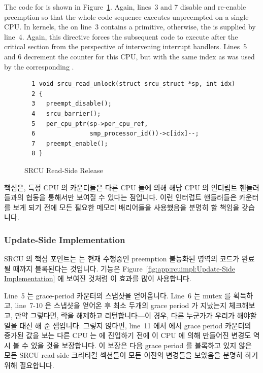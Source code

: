 The code for  is shown in
Figure~\ref{fig:app:rcuimpl:Read-Side Release}.
Again, lines~3 and 7 disable and re-enable preemption so that the
whole code sequence executes unpreempted on a single CPU.
In  kernels, the  on line~3
contains a  primitive, otherwise, the 
is supplied by line~4.
Again, this directive forces the subsequent code to execute after
the critical section from the perspective of intervening
interrupt handlers.
Lines~5 and 6 decrement the counter for this CPU, but with the same
index as was used by the corresponding .
\fi

\begin{figure}[htbp]
{ \scriptsize
\begin{verbatim}
  1 void srcu_read_unlock(struct srcu_struct *sp, int idx)
  2 {
  3   preempt_disable();
  4   srcu_barrier();
  5   per_cpu_ptr(sp->per_cpu_ref,
  6               smp_processor_id())->c[idx]--;
  7   preempt_enable();
  8 }
\end{verbatim}
}
\caption{SRCU Read-Side Release}
\label{fig:app:rcuimpl:Read-Side Release}
\end{figure}

핵심은, 특정 CPU 의 카운터들은 다른 CPU 들에 의해 해당 CPU 의 인터럽트
핸들러들과의 협동을 통해서만 보여질 수 있다는 점입니다.
이런 인터럽트 핸들러들은 카운터를 보게 되기 전에 모든 필요한 메모리 배리어들을
사용했음을 분명히 할 책임을 갖습니다.

\subsubsection{Update-Side Implementation}
\label{sec:app:rcuimpl:Update-Side Implementation}

SRCU 의 핵심 포인트는  는 현재 수행중인 preemption
불능화된 영역의 코드가 완료될 때까지 블록된다는 것입니다.
 기능은
Figure~\ref{fig:app:rcuimpl:Update-Side Implementation} 에 보여진 것처럼 이
효과를 많이 사용합니다.

Line~5 는 grace-period 카운터의 스냅샷을 얻어옵니다.
Line~6 는 mutex 를 획득하고, line~7-10 은 스냅샷을 얻어온 후 최소 두개의 grace
period 가 지났는지 체크해보고, 만약 그렇다면, 락을 해제하고 리턴합니다---이
경우, 다른 누군가가 우리가 해야할 일을 대신 해 준 셈입니다.
그렇지 않다면, line~11 에서  에서 grace period 카운터의
증가된 값을 보는 다른 CPU 는  에 진입하기 전에 이 CPU 에
의해 만들어진 변경도 역시 볼 수 있을 것을 보장합니다.
이 보장은 다음 grace period 를 블록하고 있지 않은 모든 SRCU read-side 크리티컬
섹션들이 모든 이전의 변경들을 보았음을 분명히 하기 위해 필요합니다.
\iffalse

